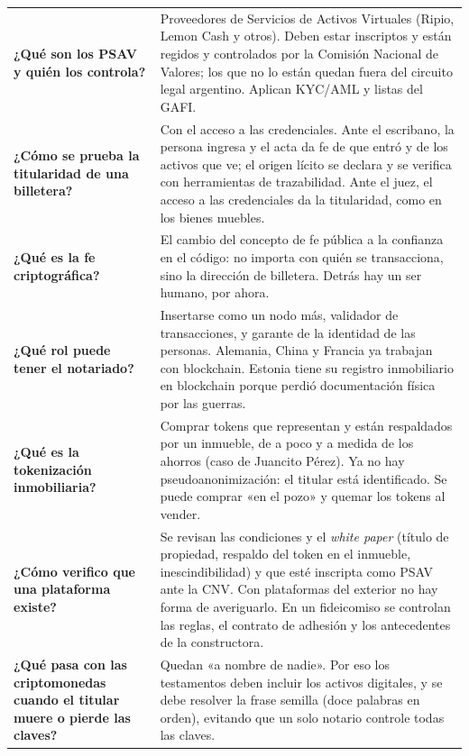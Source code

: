 \documentclass[12pt,oneside]{book}
\begin{document}
\begin{longtable}{
    >{\raggedright\arraybackslash}p{}
    >{\raggedright\arraybackslash}p{}
}
\textbf{¿Qué son los PSAV y quién los controla?} &
Proveedores de Servicios de Activos Virtuales (Ripio, Lemon Cash y otros). Deben estar inscriptos y están regidos y controlados por la Comisión Nacional de Valores; los que no lo están quedan fuera del circuito legal argentino. Aplican KYC/AML y listas del GAFI. \\

\textbf{¿Cómo se prueba la titularidad de una billetera?} &
Con el acceso a las credenciales. Ante el escribano, la persona ingresa y el acta da fe de que entró y de los activos que ve; el origen lícito se declara y se verifica con herramientas de trazabilidad. Ante el juez, el acceso a las credenciales da la titularidad, como en los bienes muebles. \\

\textbf{¿Qué es la fe criptográfica?} &
El cambio del concepto de fe pública a la confianza en el código: no importa con quién se transacciona, sino la dirección de billetera. Detrás hay un ser humano, por ahora. \\

\textbf{¿Qué rol puede tener el notariado?} &
Insertarse como un nodo más, validador de transacciones, y garante de la identidad de las personas. Alemania, China y Francia ya trabajan con blockchain. Estonia tiene su registro inmobiliario en blockchain porque perdió documentación física por las guerras. \\

\textbf{¿Qué es la tokenización inmobiliaria?} &
Comprar tokens que representan y están respaldados por un inmueble, de a poco y a medida de los ahorros (caso de Juancito Pérez). Ya no hay pseudoanonimización: el titular está identificado. Se puede comprar «en el pozo» y quemar los tokens al vender. \\

\textbf{¿Cómo verifico que una plataforma existe?} &
Se revisan las condiciones y el \textit{white paper} (título de propiedad, respaldo del token en el inmueble, inescindibilidad) y que esté inscripta como PSAV ante la CNV. Con plataformas del exterior no hay forma de averiguarlo. En un fideicomiso se controlan las reglas, el contrato de adhesión y los antecedentes de la constructora. \\

\textbf{¿Qué pasa con las criptomonedas cuando el titular muere o pierde las claves?} &
Quedan «a nombre de nadie». Por eso los testamentos deben incluir los activos digitales, y se debe resolver la frase semilla (doce palabras en orden), evitando que un solo notario controle todas las claves. \\


\end{longtable}
\end{document}
